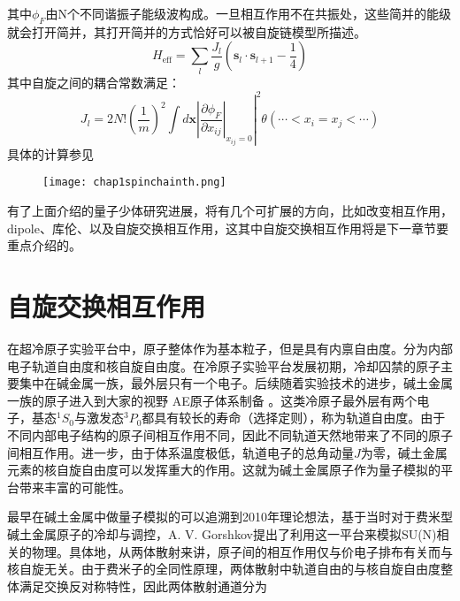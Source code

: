 其中$\phi_F$由N个不同谐振子能级波构成。一旦相互作用不在共振处，这些简并的能级就会打开简并，其打开简并的方式恰好可以被自旋链模型所描述。
\begin{equation}
H_{\mathrm{eff}}=\sum_{l} \frac{J_{l}}{g}\left(\mathbf{s}_{l} \cdot \mathbf{s}_{l+1}-\frac{1}{4}\right)
\end{equation}
其中自旋之间的耦合常数满足：
\begin{equation}
J_{l}=\left.2 N !\left(\frac{1}{m}\right)^{2} \int d \mathbf{x}\left|\frac{\partial \phi_{F}}{\partial x_{i j}}\right|_{x_{i j}=0}\right|^{2} \theta\left(\cdots<x_{i}=x_{j}<\cdots\right)
\end{equation}
具体的计算参见\cite{Guan2009exact,Santos2014spinchain,Yang2016effective}
\begin{figure}[!htbp]
    \centering
    \texttt{[image: chap1spinchainth.png]}
    \label{spinchainth}
\end{figure}

有了上面介绍的量子少体研究进展，将有几个可扩展的方向，比如改变相互作用，dipole、库伦、以及自旋交换相互作用，这其中自旋交换相互作用将是下一章节要重点介绍的。

\section{自旋交换相互作用}\label{sec:spin-exchange}
在超冷原子实验平台中，原子整体作为基本粒子，但是具有内禀自由度。分为内部电子轨道自由度和核自旋自由度。在冷原子实验平台发展初期，冷却囚禁的原子主要集中在碱金属一族，最外层只有一个电子。后续随着实验技术的进步，碱土金属一族的原子进入到大家的视野{\color{red} AE原子体系制备 }。这类冷原子最外层有两个电子，基态${}^1S_0$与激发态${}^3P_0$都具有较长的寿命（选择定则），称为轨道自由度。由于不同内部电子结构的原子间相互作用不同，因此不同轨道天然地带来了不同的原子间相互作用。进一步，由于体系温度极低，轨道电子的总角动量$J$为零，碱土金属元素的核自旋自由度可以发挥重大的作用。这就为碱土金属原子作为量子模拟的平台带来丰富的可能性。

最早在碱土金属中做量子模拟的可以追溯到2010年理论想法，基于当时对于费米型碱土金属原子的冷却与调控，A. V. Gorshkov\cite{gorshkov2010two}提出了利用这一平台来模拟SU(N)相关的物理。具体地，从两体散射来讲，原子间的相互作用仅与价电子排布有关而与核自旋无关。由于费米子的全同性原理，两体散射中轨道自由的与核自旋自由度整体满足交换反对称特性，因此两体散射通道分为

